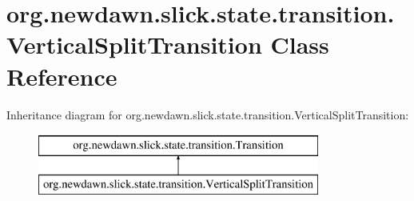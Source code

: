 \hypertarget{classorg_1_1newdawn_1_1slick_1_1state_1_1transition_1_1_vertical_split_transition}{}\section{org.\+newdawn.\+slick.\+state.\+transition.\+Vertical\+Split\+Transition Class Reference}
\label{classorg_1_1newdawn_1_1slick_1_1state_1_1transition_1_1_vertical_split_transition}
Inheritance diagram for org.\+newdawn.\+slick.\+state.\+transition.\+Vertical\+Split\+Transition\+:\begin{figure}[H]
\begin{center}
\leavevmode
\includegraphics[height=2.000000cm]{classorg_1_1newdawn_1_1slick_1_1state_1_1transition_1_1_vertical_split_transition}
\end{center}
\end{figure}
